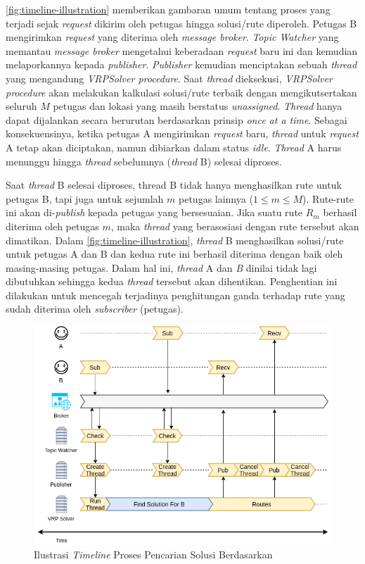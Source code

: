 \autoref{fig:timeline-illustration} memberikan gambaran umum tentang proses yang terjadi sejak \textit{request} dikirim oleh petugas hingga solusi/rute diperoleh. Petugas B mengirimkan \textit{request} yang diterima oleh \textit{message broker}. \textit{Topic Watcher} yang memantau \textit{message broker} mengetahui keberadaan \textit{request} baru ini dan kemudian melaporkannya kepada \textit{publisher}. \textit{Publisher} kemudian menciptakan sebuah \textit{thread} yang mengandung \textit{VRPSolver procedure}. Saat \textit{thread} dieksekusi, \textit{VRPSolver procedure} akan melakukan kalkulasi solusi/rute terbaik dengan mengikutsertakan seluruh $M$ petugas dan lokasi yang masih berstatus \textit{unassigned}. \textit{Thread} hanya dapat dijalankan secara berurutan berdasarkan prinsip \textit{once at a time}. Sebagai konsekuensinya, ketika petugas A mengirimkan \textit{request} baru, \textit{thread} untuk \textit{request} A tetap akan diciptakan, namun dibiarkan dalam status \textit{idle}. \textit{Thread} A harus menunggu hingga \textit{thread} sebelumnya (\textit{thread} B) selesai diproses. 

Saat \textit{thread} B selesai diproses, {thread} B tidak hanya menghasilkan rute untuk petugas B, tapi juga untuk sejumlah $m$ petugas lainnya ($1 \leq m \leq M$). Rute-rute ini akan di-\textit{publish} kepada petugas yang bersesuaian. Jika suatu rute $R_m$ berhasil diterima oleh petugas $m$, maka \textit{thread} yang berasosiasi dengan rute tersebut akan dimatikan. Dalam \autoref{fig:timeline-illustration}, \textit{thread} B menghasilkan solusi/rute untuk petugas A dan B dan kedua rute ini berhasil diterima dengan baik oleh masing-masing petugas. Dalam hal ini, \textit{thread} A dan \textit{B} dinilai tidak lagi dibutuhkan sehingga kedua \textit{thread} tersebut akan dihentikan. Penghentian ini dilakukan untuk mencegah terjadinya penghitungan ganda terhadap rute yang sudah diterima oleh \textit{subscriber} (petugas). 


\begin{figure}[!]
	\centering
	\includegraphics[width=\textwidth]{Resources/Images/timeline-illustration}
	\caption{Ilustrasi \textit{Timeline} Proses Pencarian Solusi Berdasarkan}
	\label{fig:timeline-illustration}
\end{figure}


